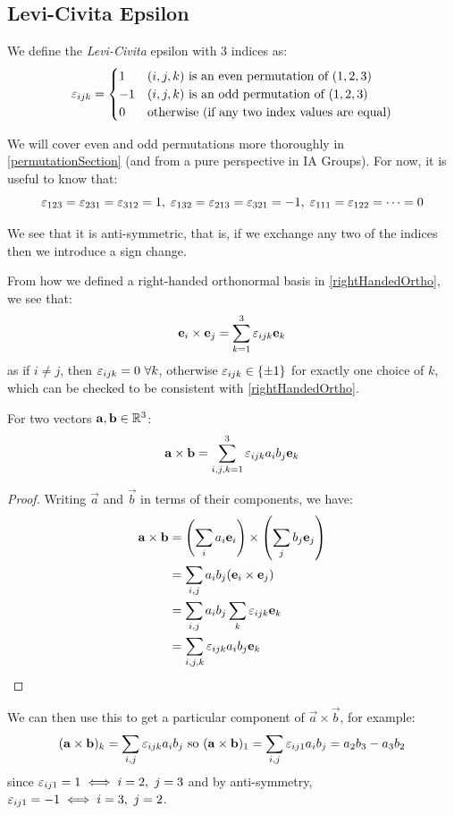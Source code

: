 \documentclass[../main.tex]{subfiles}
\begin{document}
\subsection{Levi-Civita Epsilon}
\begin{definition}
  We define the \textit{Levi-Civita} epsilon with 3 indices as: \label{lce3}
  \[
    \varepsilon_{i j k} = \begin{cases}
    1 & (i,j,k) \text{ is an even permutation of }(1, 2, 3) \\
    -1 & (i, j, k) \text{ is an odd permutation of }(1, 2, 3) \\
    0 & \text{otherwise (if any two index values are equal)}
    \end{cases}
  \]
\end{definition}
\begin{remark}
  We will cover even and odd permutations more thoroughly in \cref{permutationSection} (and from a pure perspective in IA Groups).
  For now, it is useful to know that:
  \[
   \varepsilon_{123} = \varepsilon_{231} = \varepsilon_{312} = 1,\; \varepsilon_{132} = \varepsilon_{213} = \varepsilon_{321} = -1,\; \varepsilon_{111} = \varepsilon_{122} = \cdots = 0
  \]
\end{remark}
We see that it is anti-symmetric, that is, if we exchange any two of the indices then we introduce a sign change.

From how we defined a right-handed orthonormal basis in \cref{rightHandedOrtho}, we see that:
\[
  \mathbf{\bm{e}}_i \times \mathbf{\bm{e}}_j = \sum_{k=1}^{3} \varepsilon_{ijk} \mathbf{\bm{e}}_k
\]
as if $i \neq j$, then $\varepsilon_{i j k} = 0\ \forall k$, otherwise $\varepsilon_{i j k} \in \{\pm 1\}$ for exactly one choice of $k$, which can be checked to be consistent with \cref{rightHandedOrtho}.
\begin{lemma}
  For two vectors $\mathbf{\bm{a}}, \mathbf{\bm{b}} \in \mathbb{R}^3$:
  \[
    \mathbf{\bm{a}} \times \mathbf{\bm{b}} = \sum_{i,j,k = 1}^{3} \varepsilon_{ijk} a_i b_j \mathbf{\bm{e}}_k
  \]
\end{lemma}
\begin{proof}
  Writing $\vec{a}$ and $\vec{b}$ in terms of their components, we have:
  \begin{align*}
    \mathbf{\bm{a}} \times \mathbf{\bm{b}} &= \left(\sum_i a_i \mathbf{\bm{e}}_i\right) \times \left(\sum_j b_j \mathbf{\bm{e}}_j\right) \\
                           &= \sum_{i,j} a_i b_j (\mathbf{\bm{e}}_i \times \mathbf{\bm{e}}_j) \\
                           &= \sum_{i,j} a_i b_j \sum_k \varepsilon_{i j k} \mathbf{\bm{e}}_k \\
                           &= \sum_{i,j,k} \varepsilon_{i j k} a_i b_j \mathbf{\bm{e}}_k
  \end{align*}
\end{proof}
We can then use this to get a particular component of $\vec{a} \times \vec{b}$, for example:
\begin{equation}
  \label{crossComponent}
  (\mathbf{\bm{a}} \times \mathbf{\bm{b}})_k = \sum_{i, j} \varepsilon_{i j k} a_i b_j \text{ so }
  (\mathbf{\bm{a}} \times \mathbf{\bm{b}})_1 = \sum_{i, j} \varepsilon_{i j 1} a_i b_j = a_2 b_3 - a_3 b_2
\end{equation}
since $\varepsilon_{i j 1} = 1 \iff i = 2,\ j = 3$ and by anti-symmetry, $\varepsilon_{i j 1} = -1 \iff i = 3,\ j = 2$.
\end{document}
